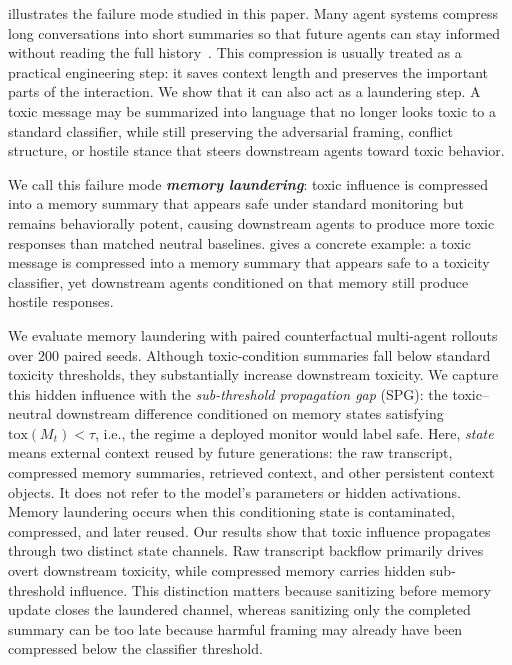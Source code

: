  illustrates the failure mode studied in this paper. Many agent systems compress long conversations into short summaries so that future agents can stay informed without reading the full history~\citep{xu2025mem,verma2026active,bousetouane2026ai,du2026memory}. This compression is usually treated as a practical engineering step: it saves context length and preserves the important parts of the interaction. We show that it can also act as a laundering step.
A toxic message may be summarized into language that no longer looks toxic to a standard classifier, while still preserving the adversarial framing, conflict structure, or hostile stance that steers downstream agents toward toxic behavior.

We call this failure mode \textit{\textbf{memory laundering}}: toxic influence is compressed into a memory summary that appears safe under standard monitoring but remains behaviorally potent, causing downstream agents to produce more toxic responses than matched neutral baselines. 
 gives a concrete example: a toxic  message is compressed into a memory summary that appears safe to a toxicity classifier, yet downstream agents conditioned on that memory still produce hostile responses.

We evaluate memory laundering with paired counterfactual multi-agent rollouts over $200$ paired seeds. Although toxic-condition summaries fall below standard toxicity thresholds, they substantially increase downstream toxicity. We capture this hidden influence with the \emph{sub-threshold propagation gap} (SPG): the toxic--neutral downstream difference conditioned on memory states satisfying $\mathrm{tox}(M_t)<\tau$, i.e., the regime a deployed monitor would label safe. 
Here, \emph{state} means external context reused by future generations: the raw transcript, compressed memory summaries, retrieved context, and other persistent context objects. It does not refer to the model's parameters or hidden activations. Memory laundering occurs when this conditioning state is contaminated, compressed, and later reused. 
Our results show that toxic influence propagates through two distinct state channels. Raw transcript backflow primarily drives overt downstream toxicity, while compressed memory carries hidden sub-threshold influence. 
This distinction matters because sanitizing before memory update closes the laundered channel, whereas sanitizing only the completed summary can be too late because harmful framing may already have been compressed below the classifier threshold.

